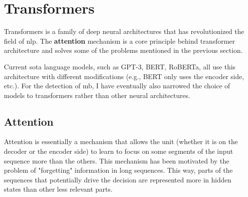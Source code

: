\section{Transformers}\label{att_transformers}
Transformers is a family of deep neural architectures that has revolutionized the field of \gls{nlp}. The \textbf{attention} mechanism is a core principle behind transformer architecture and solves some of the problems mentioned in the previous section.

Current \gls{sota} language models, such as GPT-3, BERT, RoBERTa, all use this architecture with different modifications (e.g., BERT only uses the encoder side, etc.). For the detection of \gls{mb}, I have eventually also narrowed the choice of models to transformers rather than other neural architectures.



\subsection{Attention}
Attention \cite{bahdanau2014neural,luongeffective} is essentially a mechanism that allows the unit (whether it is on the decoder or the encoder side) to learn to focus on some segments of the input sequence more than the others. This mechanism has been motivated by the problem of "forgetting" information in long sequences. This way, parts of the sequences that potentially drive the decision are represented more in hidden states than other less relevant parts.

